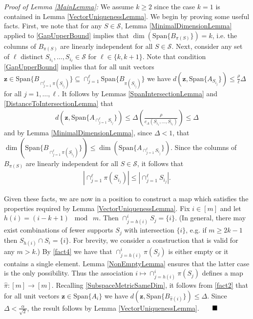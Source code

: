 \documentclass[journal,onecolumn]{IEEEtran}
\begin{document}
\emph{Proof of Lemma \ref{MainLemma}:} 
We assume $k \geq 2$ since the case $k = 1$ is contained in Lemma \ref{VectorUniquenessLemma}. We begin by proving some useful facts. First, we note that for any $S \in \mathcal{S}$, Lemma \ref{MinimalDimensionLemma} applied to \eqref{GapUpperBound} implies that $\dim(\text{Span}\{B_{\pi(S)}\}) = k$, i.e. the columns of $B_{\pi(S)}$ are linearly independent for all $S \in \mathcal{S}$. Next, consider any set of $\ell$ distinct $S_{i_1}, \ldots, S_{i_\ell} \in \mathcal{S}$ for $\ell \in \{k, k+1\}$. Note that condition \eqref{GapUpperBound} implies that for all unit vectors $\mathbf{z} \in  \text{Span}\{B_{\cap_{j = 1}^\ell\pi(S_{i_j})}\} \subseteq \cap_{j = 1}^\ell \text{Span}\{B_{\pi(S_{i_j})}\}$ we have $d(\mathbf{z}, \text{Span}\{A_{S_{i_j}}\}) \leq \frac{\rho}{\ell} \Delta$ for all $j = 1, \ldots, \ell$. It follows by Lemmas \ref{SpanIntersectionLemma} and \ref{DistanceToIntersectionLemma} that 
\begin{align}\label{fact2}
d\left( \mathbf{z}, \text{Span}\{A_{\cap_{j=1}^\ell S_{i_j}}\} \right) \leq \Delta \left( \frac{\rho}{c_A(S_{i_1}, \ldots, S_{i_\ell})} \right) \leq \Delta
\end{align}
%
and by Lemma \ref{MinimalDimensionLemma}, since $\Delta < 1$, that $\dim(\text{Span}\{B_{\cap_{j = 1}^\ell\pi(S_{i_j})}\}) \leq \dim(\text{Span}\{A_{\cap_{j=1}^\ell S_{i_j}}\})$. Since the columns of $B_{\pi(S)}$ are linearly independent for all $S \in \mathcal{S}$, it follows that
\begin{align}\label{fact4}
|\cap_{j = 1}^\ell\pi(S_{i_j})| \leq |\cap_{j=1}^\ell S_{i_j} |.
\end{align}

Given these facts, we are now in a position to construct a map which satisfies the properties required by Lemma \ref{VectorUniquenessLemma}. Fix $i \in [m]$ and let $h(i) = (i - k + 1) \;\bmod\; m$. Then $\cap_{j=h(i)}^{i} S_j = \{i\}$. (In general, there may exist combinations of fewer supports $S_j$ with intersection $\{i\}$, e.g. if $m \geq 2k-1$ then $S_{h(i)} \cap S_i = \{i\}$. For brevity, we consider a construction that is valid for any $m > k$.) By \eqref{fact4} we have that $\cap_{j = h(i)}^i\pi(S_j)$ is either empty or it contains a single element. Lemma \ref{NonEmptyLemma} ensures that the latter case is the only possibility. Thus the association $i \mapsto \cap_{j = h(i)}^i\pi(S_j)$ defines a map $\hat \pi: [m] \to [m]$. Recalling \eqref{SubspaceMetricSameDim}, it follows from \eqref{fact2} that for all unit vectors $\mathbf{z} \in \text{Span}\{A_{i}\}$ we have $d\left( \mathbf{z}, \text{Span}\{B_{\hat \pi(i)}\}\right) \leq \Delta$. Since $\Delta < \frac{\alpha}{\sqrt{2}}$, the result follows by Lemma \ref{VectorUniquenessLemma}. $\indent \blacksquare$
\end{document}
